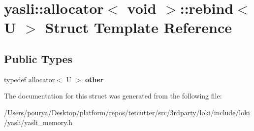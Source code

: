\hypertarget{structyasli_1_1allocator_3_01void_01_4_1_1rebind}{}\section{yasli\+:\+:allocator$<$ void $>$\+:\+:rebind$<$ U $>$ Struct Template Reference}
\label{structyasli_1_1allocator_3_01void_01_4_1_1rebind}
\subsection*{Public Types}
\begin{DoxyCompactItemize}
\item 
\hypertarget{structyasli_1_1allocator_3_01void_01_4_1_1rebind_a880c1f8bcb6e63cf8d704aab2d8b4ba4}{}typedef \hyperlink{classyasli_1_1allocator}{allocator}$<$ U $>$ {\bfseries other}\label{structyasli_1_1allocator_3_01void_01_4_1_1rebind_a880c1f8bcb6e63cf8d704aab2d8b4ba4}

\end{DoxyCompactItemize}


The documentation for this struct was generated from the following file\+:\begin{DoxyCompactItemize}
\item 
/\+Users/pourya/\+Desktop/platform/repos/tetcutter/src/3rdparty/loki/include/loki/yasli/yasli\+\_\+memory.\+h\end{DoxyCompactItemize}
